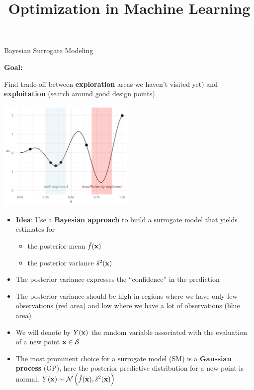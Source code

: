 \documentclass[11pt,compress,t,notes=noshow, xcolor=table]{beamer}
\title{Optimization in Machine Learning}
\date{}
\begin{document}


\begin{vbframe}{Bayesian Surrogate Modeling}

\textbf{Goal:}

Find trade-off between \textbf{exploration} areas we haven't visited yet) and \textbf{exploitation} (search around good design points)

\vspace{+.45cm}

\begin{center}
  \includegraphics[width = 0.5\textwidth]{figure_man/bayesian_loop_0.png}
\end{center}

\framebreak 

\begin{itemize}
\item \textbf{Idea}: Use a \textbf{Bayesian approach} to build a surrogate model that yields estimates for 
\begin{itemize}
  \item the posterior mean $\hat{f}(\mathbf{x})$
  \item the posterior variance $\hat{s}^2(\mathbf{x})$
\end{itemize}
\item The posterior variance expresses the \enquote{confidence} in the prediction
\item The posterior variance should be high in regions where we have only few observations (red area) and low where we have a lot of observations (blue area)
\item We will denote by $Y(\mathbf{x})$ the random variable associated with the evaluation of a new point $\mathbf{x} \in \mathcal{S}$
\item The most prominent choice for a surrogate model (SM) is a \textbf{Gaussian process} (GP), here the posterior predictive distribution for a new point is normal, $Y(\mathbf{x}) \sim \mathcal{N}\left(\hat{f}(\mathbf{x}), \hat{s}^2(\mathbf{x})\right)$
\end{itemize}


\end{vbframe}
\end{document}
